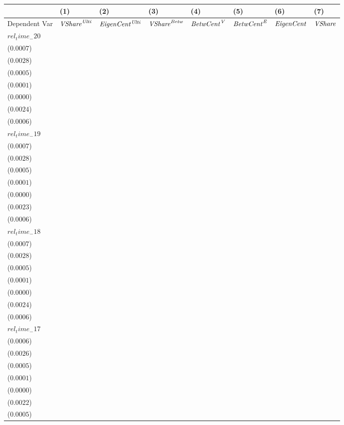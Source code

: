\begin{tabular}{llllllll}
\toprule
 & (1) & (2) & (3) & (4) & (5) & (6) & (7) \\
\midrule
Dependent Var & ${\it {VShare}^{\it Ulti}}$ & ${\it EigenCent^{\it Ulti}}$ & ${\it VShare}^{\it Betw}$ & ${\it BetwCent}^{\it V}$ & ${\it BetwCent}^{\it E}$ & ${\it EigenCent}$ & ${\it VShare}$ \\
$rel_time_-20$ & \makecell{$0.0009^{}$ \\ ($0.0007$)} & \makecell{$0.0078^{***}$ \\ ($0.0028$)} & \makecell{$-0.0020^{***}$ \\ ($0.0005$)} & \makecell{$-0.0002^{***}$ \\ ($0.0001$)} & \makecell{$-0.0001^{***}$ \\ ($0.0000$)} & \makecell{$0.0057^{**}$ \\ ($0.0024$)} & \makecell{$0.0008^{}$ \\ ($0.0006$)} \\
$rel_time_-19$ & \makecell{$0.0008^{}$ \\ ($0.0007$)} & \makecell{$0.0051^{*}$ \\ ($0.0028$)} & \makecell{$-0.0021^{***}$ \\ ($0.0005$)} & \makecell{$-0.0002^{***}$ \\ ($0.0001$)} & \makecell{$-0.0001^{***}$ \\ ($0.0000$)} & \makecell{$0.0030^{}$ \\ ($0.0023$)} & \makecell{$0.0004^{}$ \\ ($0.0006$)} \\
$rel_time_-18$ & \makecell{$-0.0003^{}$ \\ ($0.0007$)} & \makecell{$-0.0006^{}$ \\ ($0.0028$)} & \makecell{$-0.0012^{**}$ \\ ($0.0005$)} & \makecell{$0.0000^{}$ \\ ($0.0001$)} & \makecell{$-0.0000^{**}$ \\ ($0.0000$)} & \makecell{$-0.0009^{}$ \\ ($0.0024$)} & \makecell{$-0.0003^{}$ \\ ($0.0006$)} \\
$rel_time_-17$ & \makecell{$-0.0002^{}$ \\ ($0.0006$)} & \makecell{$-0.0024^{}$ \\ ($0.0026$)} & \makecell{$0.0032^{***}$ \\ ($0.0005$)} & \makecell{$0.0007^{***}$ \\ ($0.0001$)} & \makecell{$0.0001^{***}$ \\ ($0.0000$)} & \makecell{$0.0005^{}$ \\ ($0.0022$)} & \makecell{$0.0009^{*}$ \\ ($0.0005$)} \\

\end{tabular}
